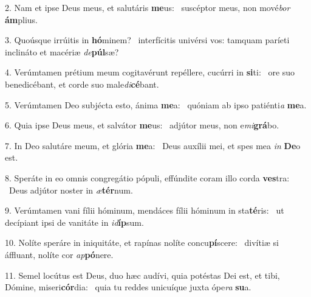 2. Nam et ipse Deus meus, et salutáris \textbf{me}us: \ast\  suscéptor meus, non mové\textit{bor} \textbf{ám}plius.\

3. Quoúsque irrúitis in \textbf{hó}minem? \ast\  interfícitis univérsi vos: tamquam paríeti inclináto et macériæ \textit{de}\textbf{púl}sæ?\

4. Verúmtamen prétium meum cogitavérunt repéllere, cucúrri in \textbf{si}ti: \ast\  ore suo benedicébant, et corde suo male\textit{di}\textbf{cé}bant.\

5. Verúmtamen Deo subjécta esto, ánima \textbf{me}a: \ast\  quóniam ab ipso patiénti\textit{a} \textbf{me}a.\

6. Quia ipse Deus meus, et salvátor \textbf{me}us: \ast\  adjútor meus, non e\textit{mi}\textbf{grá}bo.\

7. In Deo salutáre meum, et glória \textbf{me}a: \ast\  Deus auxílii mei, et spes mea \textit{in} \textbf{De}o est.\

8. Speráte in eo omnis congregátio pópuli, effúndite coram illo corda \textbf{ves}tra: \ast\  Deus adjútor noster in \textit{æ}\textbf{tér}num.\

9. Verúmtamen vani fílii hóminum, mendáces fílii hóminum in sta\textbf{té}ris: \ast\  ut decípiant ipsi de vanitáte in \textit{id}\textbf{íp}sum.\

10. Nolíte speráre in iniquitáte, et rapínas nolíte concu\textbf{pí}scere: \ast\  divítiæ si áffluant, nolíte cor \textit{ap}\textbf{pó}nere.\

11. Semel locútus est Deus, duo hæc audívi, quia potéstas Dei est, et tibi, Dómine, miseri\textbf{cór}dia: \ast\  quia tu reddes unicuíque juxta ópe\textit{ra} \textbf{su}a.\


